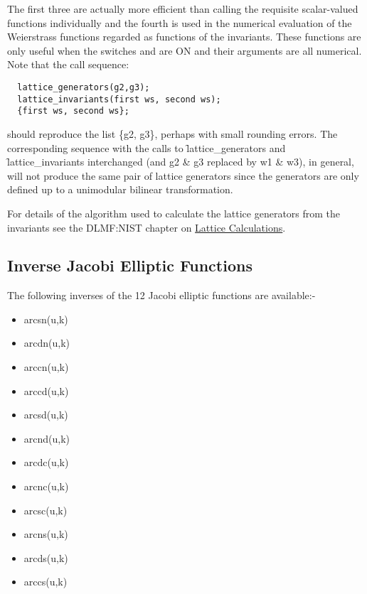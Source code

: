 The first three are actually more efficient than calling the requisite
scalar-valued functions individually and the fourth is used in the numerical
evaluation of the Weierstrass functions regarded as functions of the
invariants. These functions are only useful when the switches  and
 are ON and their arguments are all numerical.
Note that the call sequence:
\begin{verbatim}
  lattice_generators(g2,g3);
  lattice_invariants(first ws, second ws);
  {first ws, second ws};
\end{verbatim}
should reproduce the list \{g2, g3\}, perhaps with small rounding errors. The
corresponding sequence with the calls to \f{lattice\_generators} and
\f{lattice\_invariants} interchanged (and g2 \& g3 replaced by w1 \& w3),
in general, will not produce the same pair of lattice generators since the
generators are only defined up to a unimodular bilinear transformation.

For details of the algorithm used to calculate the lattice generators from the
invariants see the DLMF:NIST chapter on
\href{https://dlmf.nist.gov/23.22#ii}{Lattice Calculations}.

\subsection{Inverse Jacobi Elliptic Functions}
The following inverses of the 12 Jacobi elliptic functions are available:-
\hypertarget{INVELL}{}
\hypertarget{operator:ARCSN}{}
\hypertarget{operator:ARCCN}{}
\hypertarget{operator:ARCDN}{}
\hypertarget{operator:ARCCD}{}
\hypertarget{operator:ARCSD}{}
\hypertarget{operator:ARCND}{}
\hypertarget{operator:ARCDC}{}
\hypertarget{operator:ARCNC}{}
\hypertarget{operator:ARCSC}{}
\hypertarget{operator:ARCNS}{}
\hypertarget{operator:ARCDS}{}
\hypertarget{operator:ARCCS}{}
\begin{itemize}
\item arcsn(u,k)
\item arcdn(u,k)
\item arccn(u,k)
\item arccd(u,k)
\item arcsd(u,k)
\item arcnd(u,k)
\item arcdc(u,k)
\item arcnc(u,k)
\item arcsc(u,k)
\item arcns(u,k)
\item arcds(u,k)
\item arccs(u,k)
\end{itemize}


